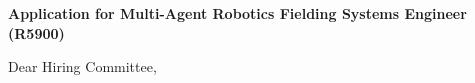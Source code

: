 \documentclass[10pt,a4paper]{article}
\newcommand{\SubjectSize}{10pt}
\newcommand{\BodySize}{9.25pt}
\newcommand{\SubjectLineSize}{11.5pt}
\newcommand{\BodyLineSize}{12.1pt}
\newcommand{\RecipientAfter}{8pt}         %
\newcommand{\SubjectAfter}{42pt}          %
\newcommand{\SalutationAfter}{18pt}       %
\begin{document}
\vspace{\RecipientAfter}

{\fontsize{\SubjectSize}{\SubjectLineSize}\selectfont
    \textbf{\textcolor{CVBlack}{Application for Multi-Agent Robotics Fielding Systems Engineer (R5900)}}}

\vspace{\SubjectAfter}

{\fontsize{\BodySize}{\BodyLineSize}\selectfont
    \textcolor{CVDarkGray}{Dear Hiring Committee,}}


\vspace{\SalutationAfter}
\end{document}
